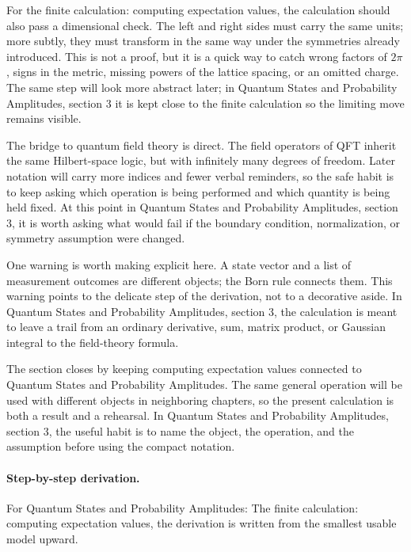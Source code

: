 For the finite calculation: computing expectation values, the calculation should also pass a dimensional check.  The left and right sides must carry the same units; more subtly, they must transform in the same way under the symmetries already introduced.  This is not a proof, but it is a quick way to catch wrong factors of \(2\pi\), signs in the metric, missing powers of the lattice spacing, or an omitted charge.  The same step will look more abstract later; in Quantum States and Probability Amplitudes, section 3 it is kept close to the finite calculation so the limiting move remains visible.

The bridge to quantum field theory is direct.  The field operators of QFT inherit the same Hilbert-space logic, but with infinitely many degrees of freedom.  Later notation will carry more indices and fewer verbal reminders, so the safe habit is to keep asking which operation is being performed and which quantity is being held fixed.  At this point in Quantum States and Probability Amplitudes, section 3, it is worth asking what would fail if the boundary condition, normalization, or symmetry assumption were changed.

One warning is worth making explicit here.  A state vector and a list of measurement outcomes are different objects; the Born rule connects them.  This warning points to the delicate step of the derivation, not to a decorative aside.  In Quantum States and Probability Amplitudes, section 3, the calculation is meant to leave a trail from an ordinary derivative, sum, matrix product, or Gaussian integral to the field-theory formula.

The section closes by keeping computing expectation values connected to Quantum States and Probability Amplitudes.  The same general operation will be used with different objects in neighboring chapters, so the present calculation is both a result and a rehearsal.  In Quantum States and Probability Amplitudes, section 3, the useful habit is to name the object, the operation, and the assumption before using the compact notation.



\paragraph{Step-by-step derivation.}

For Quantum States and Probability Amplitudes: The finite calculation: computing expectation values, the derivation is written from the smallest usable model upward.

